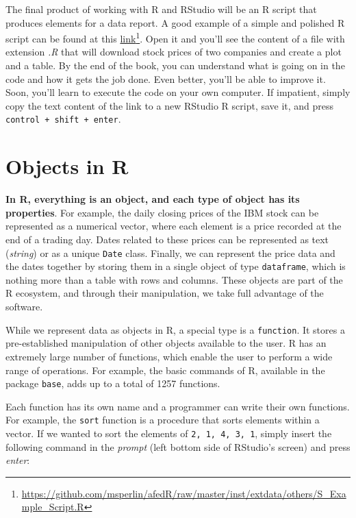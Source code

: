 \documentclass[
  12pt,
]{book}
\begin{document}
The final product of working with R and RStudio will be an R script that produces elements for a data report. A good example of a simple and polished R script can be found at this \href{https://github.com/msperlin/afedR/raw/master/inst/extdata/others/S_Example_Script.R}{link}\footnote{\url{https://github.com/msperlin/afedR/raw/master/inst/extdata/others/S_Example_Script.R}}. Open it and you'll see the content of a file with extension \emph{.R} that will download stock prices of two companies and create a plot and a table. By the end of the book, you can understand what is going on in the code and how it gets the job done. Even better, you'll be able to improve it. Soon, you'll learn to execute the code on your own computer. If impatient, simply copy the text content of the link to a new RStudio R script, save it, and press \texttt{control\ +\ shift\ +\ enter}.

\hypertarget{objects-in-r}{%
\section{Objects in R}\label{objects-in-r}}

\textbf{In R, everything is an object, and each type of object has its properties}. For example, the daily closing prices of the IBM stock can be represented as a numerical vector, where each element is a price recorded at the end of a trading day. Dates related to these prices can be represented as text (\emph{string}) or as a unique \texttt{Date} class. Finally, we can represent the price data and the dates together by storing them in a single object of type \texttt{dataframe}, which is nothing more than a table with rows and columns. These objects are part of the R ecosystem, and through their manipulation, we take full advantage of the software.

While we represent data as objects in R, a special type is a \texttt{function}. It stores a pre-established manipulation of other objects available to the user. R has an extremely large number of functions, which enable the user to perform a wide range of operations. For example, the basic commands of R, available in the package \texttt{base}, adds up to a total of 1257 functions.

Each function has its own name and a programmer can write their own functions. For example, the \texttt{sort} function is a procedure that sorts elements within a vector. If we wanted to sort the elements of \texttt{2,\ 1,\ 4,\ 3,\ 1}, simply insert the following command in the \emph{prompt} (left bottom side of RStudio's screen) and press \emph{enter}:  
\end{document}
